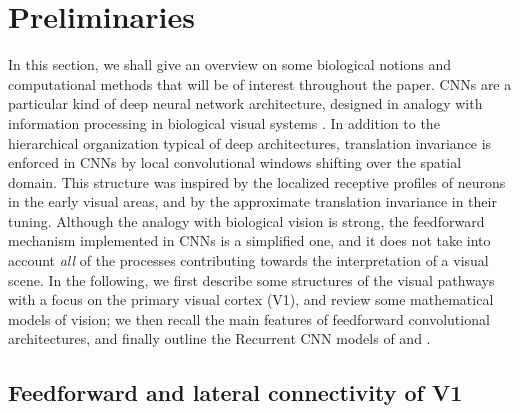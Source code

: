 \documentclass[11pt,oneside,reqno]{amsart}
\begin{document}
 
 \section{Preliminaries}
 
 In this section, we shall give an overview on some biological notions and computational methods that will be of interest throughout the paper. CNNs are a particular kind of deep neural network architecture, designed in analogy with information processing in biological visual systems \citep{fuku,lecun_cnns}. In addition to the hierarchical organization typical of deep architectures, translation invariance is enforced in CNNs by local convolutional windows shifting over the spatial domain. This structure was inspired by the localized receptive profiles of neurons in the early visual areas, and by the approximate translation invariance in their tuning. Although the analogy with biological vision is strong, the feedforward mechanism implemented in CNNs is a simplified one, and it does not take into account \emph{all} of the processes contributing towards the interpretation of a visual scene. In the following, we first describe some structures of the visual pathways with a focus on the primary visual cortex (V1), and review some mathematical models of vision; we then recall the main features of feedforward convolutional architectures, and finally outline the Recurrent CNN models of \citet{liang} and \citet{spoerer}.
 
 \subsection{Feedforward and lateral connectivity of V1}\label{v1}
 
\end{document}
